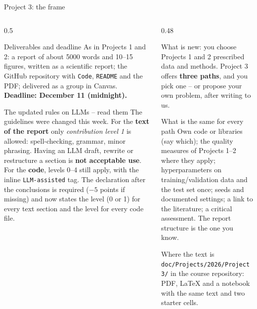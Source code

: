\documentclass[10pt,aspectratio=169]{beamer}
\begin{document}
\begin{frame}{Project 3: the frame}
\footnotesize
\begin{columns}[T]
\begin{column}{0.5\textwidth}
\begin{block}{Deliverables and deadline}
As in Projects 1 and 2: a report of about 5000 words and 10--15 figures,
written as a scientific report; the GitHub repository with \texttt{Code},
\texttt{README} and the PDF; delivered as a group in Canvas.
\textbf{Deadline: December 11 (midnight).}
\end{block}
\begin{block}{The updated rules on LLMs -- read them}
The guidelines were changed this week.  For the \textbf{text of the report}
only \emph{contribution level 1} is allowed: spell-checking, grammar, minor
phrasing.  Having an LLM draft, rewrite or restructure a section is
\textbf{not acceptable use}.  For the \textbf{code}, levels 0--4 still apply,
with the inline \texttt{LLM-assisted} tag.  The declaration after the
conclusions is required ($-5$ points if missing) and now states the level
(0 or 1) for every text section and the level for every code file.
\end{block}
\end{column}
\begin{column}{0.48\textwidth}
\begin{block}{What is new: you choose}
Projects 1 and 2 prescribed data and methods.  Project 3 offers
\textbf{three paths}, and you pick one -- or propose your own problem,
after writing to us.
\end{block}
\begin{block}{What is the same for every path}
Own code or libraries (say which); the quality measures of Projects 1--2
where they apply; hyperparameters on training/validation data and the test
set once; seeds and documented settings; a link to the literature; a
critical assessment.  The report structure is the one you know.
\end{block}
\begin{block}{Where the text is}
\texttt{doc/Projects/2026/Project3/} in the course repository: PDF, LaTeX
and a notebook with the same text and two starter cells.
\end{block}
\end{column}
\end{columns}
\end{frame}
\end{document}

